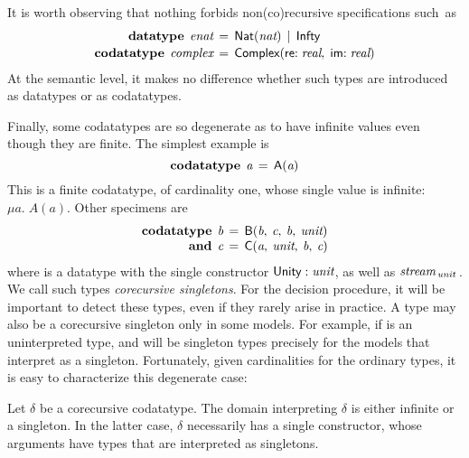 It is worth observing that nothing forbids non(co)recursive specifications
such~as
\[\begin{aligned}[t]
      \textbf{datatype}\;\, \textit{enat} & \,=\, \textsf{Nat}(\textit{nat}) \,\mid\, \textsf{Infty} \\[-.5\jot]
      \textbf{codatatype}\; \,\textit{complex} & \,=\, \textsf{Complex}(\textsf{re}{:}\; \textit{real},\; \textsf{im}{:}\;\textit{real})
\end{aligned}
\]
At the semantic level, it makes no difference whether such types are
introduced as datatypes or as codatatypes.

Finally, some codatatypes are so degenerate as to have infinite values
even though they are finite. The simplest example is
\[\textbf{codatatype}\;\, \textit{a} \,=\, \textsf{A}(\textit{a})\]
This is a finite codatatype, of cardinality one, whose single value is
infinite: \,$\mu a.\; A(a)$. Other specimens are
\[\begin{aligned}[t]
      \textbf{codatatype}\;\, \textit{b} & \,=\, \textsf{B}(\textit{b},\: \textit{c},\: \textit{b},\: \textit{unit}) \\[-\jot]
             \textbf{and}\;\, \textit{c} & \,=\, \textsf{C}(\textit{a},\: \textit{unit},\: \textit{b},\: \textit{c})
\end{aligned}
\]
where  is a datatype with the single constructor $\textsf{Unity} :
\textit{unit}$, as well as $\textit{stream}_{\,\textit{unit}\,}$. We call such types
\emph{corecursive singletons}. For the decision procedure, it will be
important to detect these types, even if they rarely arise in practice. A type
may also be a corecursive singleton only in some models. For example, if
 is an uninterpreted type,  and  will be singleton types
precisely for the models that interpret  as a singleton. Fortunately,
given cardinalities for the ordinary types, it is easy to characterize
this degenerate case:


\begin{lemma}%
\label{lem:corecursive-singletons}%
\afterDot
Let $\delta$ be a corecursive codatatype. The domain interpreting $\delta$ is
either infinite or a singleton. In the latter case, $\delta$ necessarily has a
single constructor, whose arguments have types that are interpreted as
singletons.
\end{lemma}


